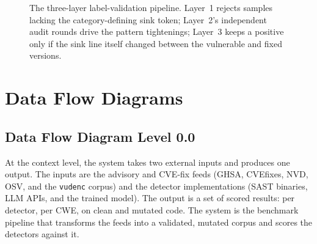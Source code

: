 \begin{figure}[htb]
\centering
{}
\caption{The three-layer label-validation pipeline. Layer~1 rejects samples
lacking the category-defining sink token; Layer~2's independent audit rounds
drive the pattern tightenings; Layer~3 keeps a positive only if the sink line
itself changed between the vulnerable and fixed versions.}
\label{fig:pipeline}
\end{figure}

\section{Data Flow Diagrams}

\subsection{Data Flow Diagram Level 0.0}

At the context level, the system takes two external inputs and produces one
output. The inputs are the advisory and CVE-fix feeds (GHSA, CVEfixes, NVD, OSV,
and the \texttt{vudenc} corpus) and the detector implementations (SAST binaries,
LLM APIs, and the trained model). The output is a set of scored results: per
detector, per CWE, on clean and mutated code. The system is the benchmark
pipeline that transforms the feeds into a validated, mutated corpus and scores
the detectors against it.

